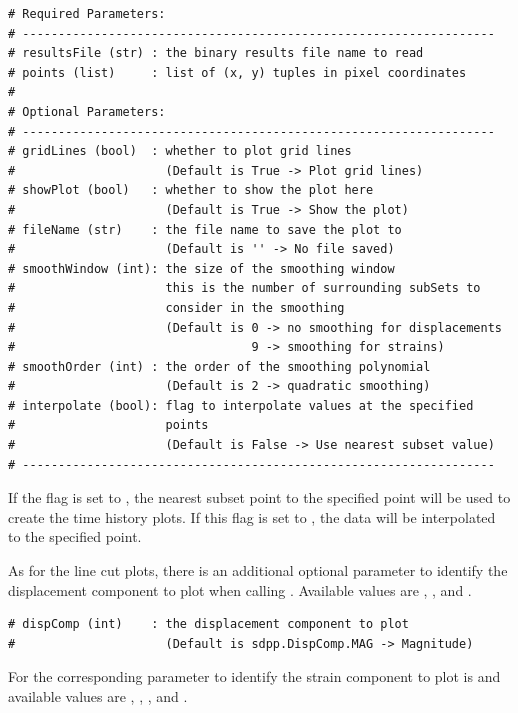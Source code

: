 \newpage
\begin{lstlisting}
# Required Parameters:
# ------------------------------------------------------------------
# resultsFile (str) : the binary results file name to read
# points (list)     : list of (x, y) tuples in pixel coordinates
# 
# Optional Parameters:
# ------------------------------------------------------------------
# gridLines (bool)  : whether to plot grid lines
#                     (Default is True -> Plot grid lines)
# showPlot (bool)   : whether to show the plot here
#                     (Default is True -> Show the plot)
# fileName (str)    : the file name to save the plot to
#                     (Default is '' -> No file saved)
# smoothWindow (int): the size of the smoothing window
#                     this is the number of surrounding subSets to 
#                     consider in the smoothing
#                     (Default is 0 -> no smoothing for displacements
#                                 9 -> smoothing for strains)
# smoothOrder (int) : the order of the smoothing polynomial
#                     (Default is 2 -> quadratic smoothing)
# interpolate (bool): flag to interpolate values at the specified 
#                     points
#                     (Default is False -> Use nearest subset value)
# ------------------------------------------------------------------
\end{lstlisting}

If the  flag is set to , the nearest subset point to the specified point will be used to create the time history plots.  If this flag is set to , the data will be interpolated to the specified point.

As for the line cut plots, there is an additional optional parameter  to identify the displacement component to plot when calling .  Available  values are , , and .

\begin{lstlisting}
# dispComp (int)    : the displacement component to plot
#                     (Default is sdpp.DispComp.MAG -> Magnitude)
\end{lstlisting}

For  the corresponding parameter to identify the strain component to plot is  and available  values are  , , , and .

